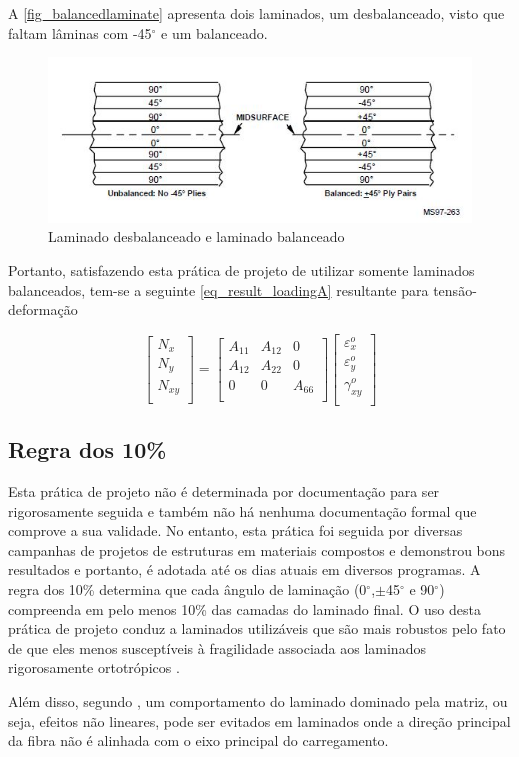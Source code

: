 A \autoref{fig_balancedlaminate} apresenta dois laminados, um desbalanceado, visto que faltam lâminas com -45$^{\circ}$ e um balanceado.

\begin{figure}[ht]
	\caption{\label{fig_balancedlaminate}Laminado desbalanceado e laminado balanceado}
  \centering
  \includegraphics[scale=1.0]{figura/BalancedLaminate}
\end{figure}

Portanto, satisfazendo esta prática de projeto de utilizar somente laminados balanceados, tem-se a seguinte \autoref{eq_result_loadingA} resultante para tensão-deformação

\begin{equation} \label{eq_result_loadingA}
\begin{bmatrix}
    N_{x} \\
    N_{y} \\
    N_{xy} \\
\end{bmatrix}
=
\begin{bmatrix}
    A_{11} & A_{12} & 0\\
    A_{12} & A_{22} & 0\\
    0 & 0 & A_{66}\\
\end{bmatrix}
\begin{bmatrix}
    \varepsilon_{x}^o \\
    \varepsilon_{y}^o \\
    \gamma_{xy}^o \\
\end{bmatrix}
\end{equation}

\subsection{Regra dos 10\%}
Esta prática de projeto não é determinada por documentação  para ser rigorosamente seguida e também não há nenhuma documentação formal que comprove a sua validade. No entanto, esta prática foi seguida por diversas campanhas de projetos de estruturas em materiais compostos e demonstrou bons resultados e portanto, é adotada até os dias atuais em diversos programas. A regra dos 10\% determina que cada ângulo de laminação (0$^{\circ}$,$\pm$45$^{\circ}$ e 90$^{\circ}$) compreenda em pelo menos 10\% das camadas do laminado final. O uso desta prática de projeto conduz a laminados utilizáveis que são mais robustos pelo fato de que eles menos susceptíveis à fragilidade associada aos laminados rigorosamente ortotrópicos \cite{nasa1997guidelines}.

Além disso, segundo \cite{mil2002handbook}, um comportamento do laminado dominado pela matriz, ou seja, efeitos não lineares, pode ser evitados em laminados onde a direção principal da fibra não é alinhada com o eixo principal do carregamento.
